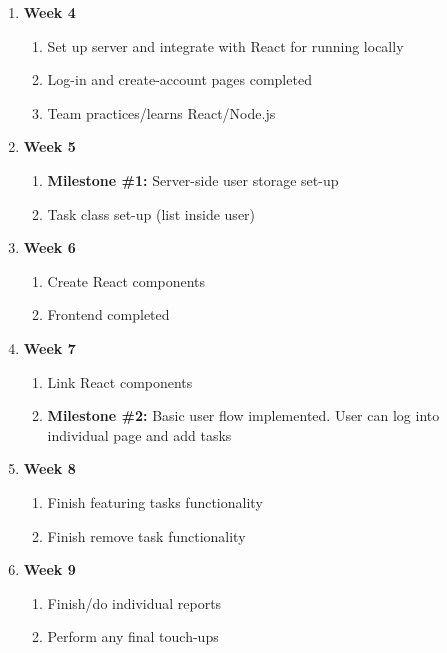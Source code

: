\documentclass[10pt, letterpaper]{article}
\begin{document}
\begin{enumerate}
	\item \textbf{Week 4}
	\begin{enumerate}
		\item Set up server and integrate with React for running locally
		\item Log-in and create-account pages completed
		\item Team practices/learns React/Node.js
	\end{enumerate}
	\item \textbf{Week 5}
	\begin{enumerate}
		\item \textbf{Milestone \#1: }Server-side user storage set-up
		\item Task class set-up (list inside user)
	\end{enumerate}
	\item \textbf{Week 6}
	\begin{enumerate}
		\item Create React components
		\item Frontend completed
	\end{enumerate}
	\item \textbf{Week 7}
	\begin{enumerate}
		\item Link React components
		\item \textbf{Milestone \#2: } Basic user flow implemented. User can log into individual page and add tasks
	\end{enumerate}
	\item \textbf{Week 8}
	\begin{enumerate}
		\item Finish featuring tasks functionality
		\item Finish remove task functionality
	\end{enumerate}
	\item \textbf{Week 9}
	\begin{enumerate}
		\item Finish/do individual reports
		\item Perform any final touch-ups
	\end{enumerate}

	
	
\end{enumerate}
\end{document}
